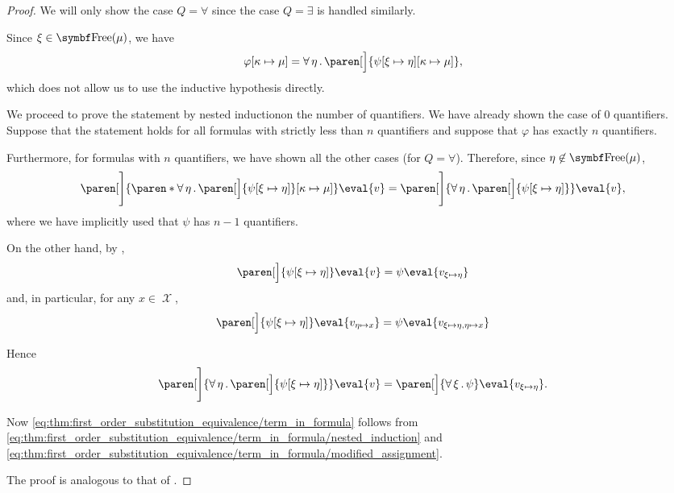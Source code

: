 \begin{proof}
  We will only show the case \( Q = \forall \) since the case \( Q = \exists \) is handled similarly.

  Since \( \xi \in \bfop{Free}(\mu) \), we have
  \begin{equation*}
    \varphi[\kappa \mapsto \mu]
    =
    \qforall{\eta} \paren[\Big]{ \psi[\xi \mapsto \eta][\kappa \mapsto \mu] },
  \end{equation*}
  which does not allow us to use the inductive hypothesis directly.

  We proceed to prove the statement by nested induction\IND on the number of quantifiers. We have already shown the case of \( 0 \) quantifiers. Suppose that the statement holds for all formulas with strictly less than \( n \) quantifiers and suppose that \( \varphi \) has exactly \( n \) quantifiers.

  Furthermore, for formulas with \( n \) quantifiers, we have shown all the other cases (for \( Q = \forall \)). Therefore, since \( \eta \not\in \bfop{Free}(\mu) \),
  \begin{equation}\label{eq:thm:first_order_substitution_equivalence/term_in_formula/nested_induction}
    \paren[\Bigg]{ \paren*{ \qforall{\eta} \paren[\Big]{ \psi[\xi \mapsto \eta] } }[\kappa \mapsto \mu] }\eval{v}
    =
    \paren[\Bigg]{\qforall{\eta} \paren[\Big]{ \psi[\xi \mapsto \eta] } }\eval{v},
  \end{equation}
  where we have implicitly used that \( \psi \) has \( n - 1 \) quantifiers.

  On the other hand, by ,
  \begin{equation*}
    \paren[\Big]{ \psi[\xi \mapsto \eta] }\eval{v} = \psi\eval{v_{\xi \mapsto \eta}}
  \end{equation*}
  and, in particular, for any \( x \in \mscrX \),
  \begin{equation*}
    \paren[\Big]{ \psi[\xi \mapsto \eta] }\eval{v_{\eta \mapsto x}} = \psi\eval{v_{\xi \mapsto \eta,\eta \mapsto x}}
  \end{equation*}

  Hence
  \begin{equation}\label{eq:thm:first_order_substitution_equivalence/term_in_formula/modified_assignment}
    \paren[\Bigg]{\qforall{\eta} \paren[\Big]{ \psi[\xi \mapsto \eta] } }\eval{v}
    =
    \paren[\Big]{\qforall{\xi} \psi }\eval{v_{\xi \mapsto \eta}}.
  \end{equation}

  Now \eqref{eq:thm:first_order_substitution_equivalence/term_in_formula} follows from \eqref{eq:thm:first_order_substitution_equivalence/term_in_formula/nested_induction} and \eqref{eq:thm:first_order_substitution_equivalence/term_in_formula/modified_assignment}.

   The proof is analogous to that of .
\end{proof}
